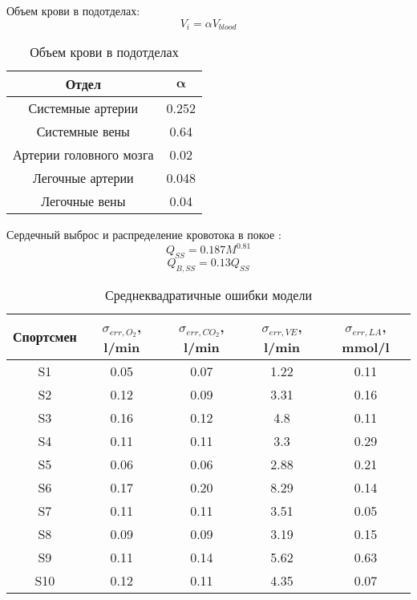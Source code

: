 Объем крови в подотделах:
\begin{equation}
    V_{i}=\alpha V_{blood}
\end{equation}
\begin{table}[!ht]
\centering
\caption{Объем крови в подотделах}
\medskip
\label{tabular:blood_volume}
\begin{tabular}{|c|c|}
\hline
\textbf{Отдел} & $\mathbf{\alpha}$ \\
\hline
Системные артерии & 0.252 \\
\hline
Системные вены & 0.64 \\
\hline
Артерии головного мозга & 0.02 \\
\hline
Легочные артерии & 0.048 \\
\hline
Легочные вены & 0.04 \\
\hline
\end{tabular}
\end{table}
Сердечный выброс и распределение кровотока в покое \cite{duke2015,schmidt}:
\begin{equation}
    Q_{SS}=0.187M^{0.81}
\end{equation}
\begin{equation}
    Q_{B,SS}=0.13Q_{SS}
\end{equation}

\begin{table}[!ht]
\centering
\caption{Среднеквадратичные ошибки модели}
\medskip
\label{tabular:tab2}
\begin{tabular}{|c|c|c|c|c|}
\hline
Спортсмен & \(\sigma_{err,O_{2}}\), l/min  & \(\sigma_{err,CO_{2}}\), l/min & \(\sigma_{err,VE}\),  l/min & \(\sigma_{err,LA}\), mmol/l\\
\hline
S1 & 0.05 & 0.07 & 1.22 & 0.11 \\
\hline
S2 & 0.12 & 0.09 & 3.31 & 0.16 \\
\hline
S3 & 0.16 & 0.12 & 4.8 & 0.11  \\
\hline
S4 & 0.11 & 0.11 & 3.3 & 0.29  \\
\hline
S5 & 0.06 & 0.06 & 2.88 & 0.21  \\
\hline
S6 & 0.17 & 0.20 & 8.29 & 0.14  \\
\hline
S7 & 0.11 & 0.11 & 3.51 & 0.05  \\
\hline
S8 & 0.09 & 0.09 & 3.19 & 0.15  \\
\hline
S9 & 0.11 & 0.14 & 5.62 & 0.63  \\
\hline
S10 & 0.12 & 0.11 & 4.35 & 0.07  \\
\hline
\end{tabular}
\end{table}

